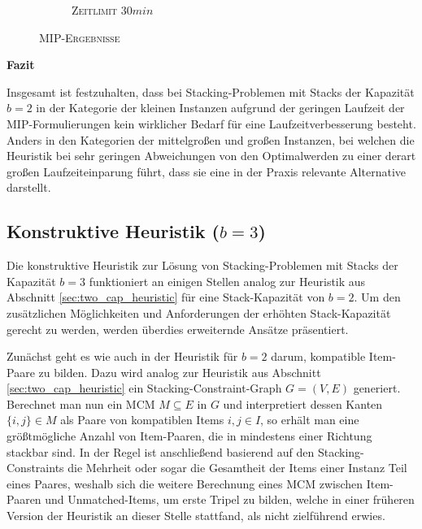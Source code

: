 \begin{figure}[H]
\begin{subfigure}[b]{0.3\textwidth}
\centering
{}
\caption{\textsc{Zeitlimit} $30min$}
\label{fig:res_b=2_l_c}
\end{subfigure}

\caption{\textsc{MIP-Ergebnisse}}
\label{fig:res_b=2_l}
\end{figure}

\textbf{Fazit}

Insgesamt ist festzuhalten, dass bei Stacking-Problemen mit Stacks der Kapazität $b = 2$ in der Kategorie der kleinen Instanzen
aufgrund der geringen Laufzeit der MIP-Formulierungen kein wirklicher Bedarf für eine Laufzeitverbesserung besteht.
Anders in den Kategorien der mittelgroßen und großen Instanzen, bei welchen die Heuristik bei sehr geringen Abweichungen
von den Optimalwerden zu einer derart großen Laufzeiteinparung führt, dass sie eine in der Praxis relevante Alternative darstellt.

\subsection{Konstruktive Heuristik ($b = 3$)}
\label{sec:three_cap_heuristic}

Die konstruktive Heuristik zur Lösung von Stacking-Problemen mit Stacks der Kapazität $b = 3$ funktioniert
an einigen Stellen analog zur Heuristik aus Abschnitt \ref{sec:two_cap_heuristic} für eine Stack-Kapazität von $b = 2$.
Um den zusätzlichen Möglichkeiten und Anforderungen der erhöhten Stack-Kapazität gerecht zu werden, werden überdies
erweiternde Ansätze präsentiert.

Zunächst geht es wie auch in der Heuristik für $b = 2$ darum, kompatible Item-Paare zu bilden.
Dazu wird analog zur Heuristik aus Abschnitt \ref{sec:two_cap_heuristic} ein Stacking-Constraint-Graph $G = (V, E)$ generiert.
Berechnet man nun ein \textsc{MCM} $M \subseteq E$ in $G$ und interpretiert dessen Kanten $\{i, j\} \in M$ als Paare von kompatiblen Items
$i, j \in I$, so erhält man eine größtmögliche Anzahl von Item-Paaren, die in mindestens einer Richtung stackbar sind.
In der Regel ist anschließend basierend auf den Stacking-Constraints die Mehrheit oder sogar die Gesamtheit der Items einer Instanz Teil eines Paares, weshalb sich die weitere Berechnung eines \textsc{MCM} zwischen Item-Paaren und Unmatched-Items,
um erste Tripel zu bilden, welche in einer früheren Version der Heuristik an dieser Stelle stattfand, als nicht zielführend
erwies.

